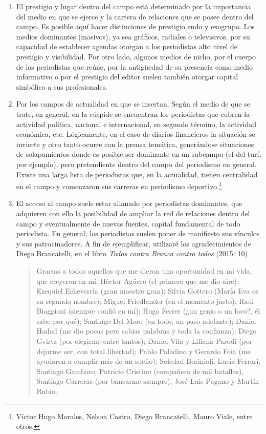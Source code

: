 \begin{enumerate} [label=\alph*.]
Sin embargo, el discurso que adoptan los dominantes del campo periodístico actual es la reivindicación del pasado  y de repudio del periodismo presente, en el que los jóvenes disputan la legitimidad con nuevas herramientas tecnológicas.

\item
El prestigio y lugar dentro del campo está determinado por la importancia del medio en que se ejerce y la cartera de relaciones que se posee dentro del campo. Es posible aquí hacer distinciones de prestigio endo y exogrupo. Los medios dominantes (masivos), ya sea gráficos, radiales o televisivos, por su capacidad de establecer agendas otorgan a los periodistas alto nivel de prestigio y visibilidad. Por otro lado, algunos medios de nicho, por el cuerpo de los periodistas que reúne, por la antigüedad de su presencia como medio informativo o por el prestigio del editor suelen también otorgar capital simbólico a sus profesionales.
\item
Por los campos de actualidad en que se insertan. Según el medio de que se trate, en general, en la cúspide se encuentran los periodistas que cubren la actividad política, nacional e internacional, en segundo término, la actividad económica, etc. Lógicamente, en el caso de diarios financieros la situación se invierte y otro tanto ocurre con la prensa temática, generándose situaciones de solapamientos donde es posible ser dominante en un subcampo (el del turf, por ejemplo), pero pretendiente dentro del campo del periodismo en general. Existe una larga lista de periodistas que, en la actualidad, tienen centralidad en el campo y comenzaron sus carreras en periodismo deportivo.\footnote{Víctor Hugo Morales, Nelson Castro, Diego Brancatelli, Mauro Viale, entre otros.}
\item
El acceso al campo suele estar allanado por periodistas dominantes, que adquieren con ello la posibilidad de ampliar la red de relaciones dentro del campo y eventualmente de nuevas fuentes, capital fundamental de todo periodista. En general, los periodistas suelen poner de manifiesto sus vínculos y sus patrocinadores. A fin de ejemplificar, utilizaré los agradecimientos de Diego Brancatelli, en el libro \emph{Todos contra Branca contra todos} (2015: 10)

\begin{quote}
	Gracias a todos aquellos que me dieron una oportunidad en mi vida, que creyeron en mí: Héctor Agüero (el primero que me dio aire); Ezequiel Echeverría (gran maestro gran); Silvia Gottero (María Eva es su segundo nombre); Miguel Friedlander (en el momento justo); Raúl Biaggioni (siempre confió en mí); Hugo Ferrer (¿un genio o un loco?, él sabe por qué); Santiago Del Moro (en todo, un paso adelante); Daniel Hadad (me dio pocas pero sabias palabras y toda la confianza); Diego Gvirtz (por elegirme entre tantos); Daniel Vila y Liliana Parodi (por dejarme ser, con total libertad); Pablo Paladino y Gerardo Foia (me ayudaron a cumplir más de un sueño); Soledad Borinioli, Lucía Ferrari, Santiago Gambaro, Patricio Cristino (compañero de mil batallas), Santiago Carreras (por bancarme siempre), José Luis Pagano y Martín Rubio.
\end{quote}



\end{enumerate}
